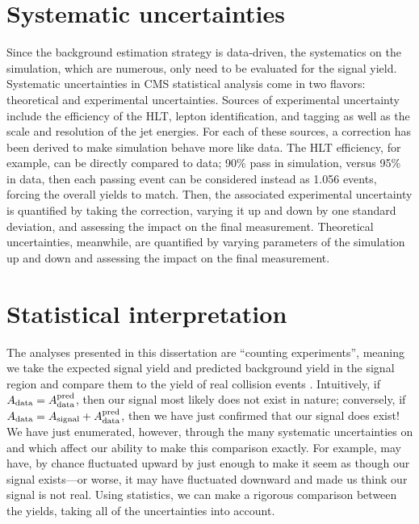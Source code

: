 \section{Systematic uncertainties}
Since the background estimation strategy is data-driven, the systematics on the simulation, which are numerous, only need to be evaluated for the signal yield. 
Systematic uncertainties in CMS statistical analysis come in two flavors: theoretical and experimental uncertainties. 
Sources of experimental uncertainty include the efficiency of the HLT, lepton identification, and \PQb tagging as well as the scale and resolution of the jet energies. 
For each of these sources, a correction has been derived to make simulation behave more like data. 
The HLT efficiency, for example, can be directly compared to data; 90\% pass in simulation, versus 95\% in data, then each passing event can be considered instead as 1.056 events, forcing the overall yields to match. 
Then, the associated experimental uncertainty is quantified by taking the correction, varying it up and down by one standard deviation\footnotemark{}, and assessing the impact on the final measurement. 
Theoretical uncertainties, meanwhile, are quantified by varying parameters of the simulation up and down and assessing the impact on the final measurement. 

\section{Statistical interpretation} %
The analyses presented in this dissertation are ``counting experiments'', meaning we take the expected signal yield \Asignal and predicted background yield \AdataPred in the signal region and compare them to the yield of real collision events \Adata. 
Intuitively, if $A_{\text{data}} = A_{\text{data}}^{\text{pred}}$, then our signal most likely does not exist in nature; conversely, if $A_{\text{data}} = A_{\text{signal}}+A_{\text{data}}^{\text{pred}}$, then we have just confirmed that our signal does exist! 
We have just enumerated, however, through the many systematic uncertainties on \Asignal and \AdataPred which affect our ability to make this comparison exactly. 
For example, \AdataPred may have, by chance fluctuated upward by just enough to make it seem as though our signal exists---or worse, it may have fluctuated downward and made us think our signal is not real. 
Using statistics, we can make a rigorous comparison between the yields, taking all of the uncertainties into account. 

